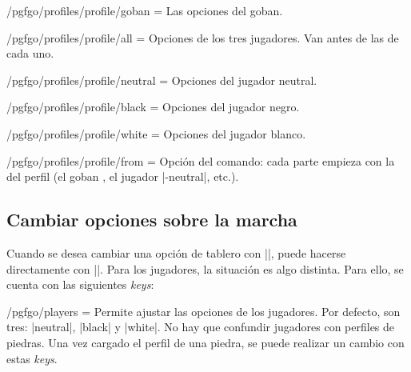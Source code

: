 \begin{goban}[9, stone = {radius = 4pt}, mark = {line = {color = red}}]
\begin{command}{\pgfgodefineprofile{}}
\begin{codeexample}[width=3cm]
		\begin{goban}[partial = A1:C3]
		\end{goban}
	\end{codeexample}

	\begin{key}{/pgfgo/profiles/profile/goban = }
		Las opciones del goban.
	\end{key}

	\begin{key}{/pgfgo/profiles/profile/all = }
		Opciones de los tres jugadores. Van antes de las de cada uno.
	\end{key}

	\begin{key}{/pgfgo/profiles/profile/neutral = }
		Opciones del jugador neutral.
	\end{key}

	\begin{key}{/pgfgo/profiles/profile/black = }
		Opciones del jugador negro.
	\end{key}

	\begin{key}{/pgfgo/profiles/profile/white = }
		Opciones del jugador blanco.
	\end{key}

	\begin{key}{/pgfgo/profiles/profile/from = }
		Opción del comando: cada parte empieza con la del perfil  (el goban , el jugador |-neutral|, etc.).
	\end{key}
\end{command}

\subsection{Cambiar opciones sobre la marcha}

Cuando se desea cambiar una opción de tablero con |\pgfgoset|, puede hacerse directamente con ||. Para los jugadores, la situación es algo distinta. Para ello, se cuenta con las siguientes \emph{keys}:

\begin{key}{/pgfgo/players = }
	Permite ajustar las opciones de los jugadores. Por defecto, son tres: |neutral|, |black| y |white|. No hay que confundir jugadores con perfiles de piedras. Una vez cargado el perfil de una piedra, se puede realizar un cambio con estas \emph{keys}.
\end{key}


\end{goban}
